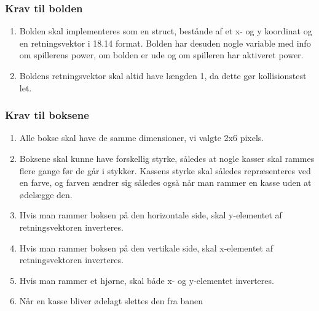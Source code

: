 \subsubsection{Krav til bolden}
\begin{enumerate}
\item Bolden skal implementeres som en struct, bestånde af et x- og y koordinat og en retningsvektor i 18.14 format. Bolden har desuden nogle variable med info om spillerens power, om bolden er ude og om spilleren har aktiveret power.
\item Boldens retningsvektor skal altid have længden 1, da dette gør kollisionstest let.
\end{enumerate}
\subsubsection{Krav til boksene}
\begin{enumerate}
\item Alle bokse skal have de samme dimensioner, vi valgte 2x6 pixels.
\item Boksene skal kunne have forskellig styrke, således at nogle kasser skal rammes flere gange før de går i stykker. Kassens styrke skal således repræsenteres ved en farve, og farven ændrer sig således også når man rammer en kasse uden at ødelægge den.
\item Hvis man rammer boksen på den horizontale side, skal y-elementet af retningsvektoren inverteres. 
\item Hvis man rammer boksen på den vertikale side, skal x-elementet af retningsvektoren inverteres.
\item Hvis man rammer et hjørne, skal både x- og y-elementet inverteres.
\item Når en kasse bliver ødelagt slettes den fra banen
\end{enumerate}



\subsection{}